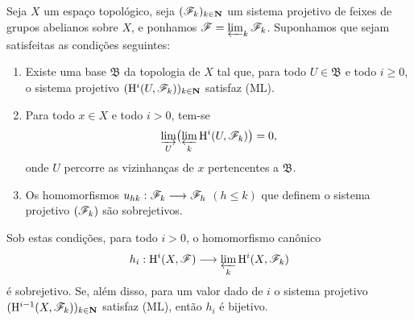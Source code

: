 \begin{proposition}[13.3.1]
\label{0.13.3.1}
Seja $X$ um espaço topológico, seja
$(\mathscr{F}_k)_{k\in\mathbf{N}}$ um sistema projetivo de feixes de
grupos abelianos sobre $X$, e ponhamos
$\mathscr{F}=\varprojlim_k\mathscr{F}_k$.
Suponhamos que sejam satisfeitas as condições seguintes:
\begin{enumerate}
  \item[{\rm(i)}]
  Existe uma base $\mathfrak{B}$ da topologia de $X$ tal que,
  para todo $U\in\mathfrak{B}$ e todo $i\geq0$, o sistema
  projetivo
  $(\mathrm{H}^i(U,\mathscr{F}_k))_{k\in\mathbf{N}}$ satisfaz (ML).

  \item[{\rm(ii)}]
  Para todo $x\in X$ e todo $i>0$, tem-se
  \[
    \varinjlim_U\bigl(\varprojlim_k
    \mathrm{H}^i(U,\mathscr{F}_k)\bigr)=0,
  \]
  onde $U$ percorre as vizinhanças de $x$ pertencentes a
  $\mathfrak{B}$.

  \item[{\rm(iii)}]
  Os homomorfismos
  $u_{hk}:\mathscr{F}_k\longrightarrow\mathscr{F}_h$ $(h\leq k)$ que definem o
  sistema projetivo $(\mathscr{F}_k)$ são sobrejetivos.
\end{enumerate}
Sob estas condições, para todo $i>0$, o homomorfismo canônico
\[
  h_i:\mathrm{H}^i(X,\mathscr{F})
  \longrightarrow
  \varprojlim_k\mathrm{H}^i(X,\mathscr{F}_k)
\]
é sobrejetivo. Se, além disso, para um valor dado de $i$ o sistema
projetivo
$(\mathrm{H}^{i-1}(X,\mathscr{F}_k))_{k\in\mathbf{N}}$ satisfaz (ML), então $h_i$ é
bijetivo.
\end{proposition}

